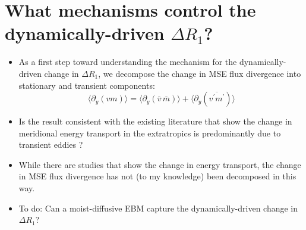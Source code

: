 \documentclass{article}
\begin{document}
\section{What mechanisms control the dynamically-driven $\Delta R_1$?}
\begin{itemize}
    \item As a first step toward understanding the mechanism for the dynamically-driven change in $\Delta R_1$, we decompose the change in MSE flux divergence into stationary and transient components:
    \begin{equation}
        \langle \partial_y(vm) \rangle = \langle \partial_y(\overline{v}\,\overline{m}) \rangle + \langle \partial_y(\overline{v^\prime m^\prime}) \rangle
    \end{equation}
    \item Is the result consistent with the existing literature that show the change in meridional energy transport in the extratropics is predominantly due to transient eddies \citep{feldl2021}?
    \item While there are studies that show the change in energy transport, the change in MSE flux divergence has not (to my knowledge) been decomposed in this way.
        \item To do: Can a moist-diffusive EBM capture the dynamically-driven change in $\Delta R_1$?
\end{itemize}




\end{document}
